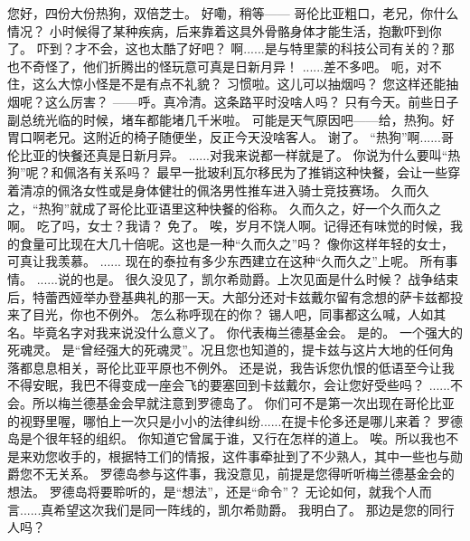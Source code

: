 \documentclass[openany]{book}
\begin{document}
\begin{dialogue}
     您好，四份大份热狗，双倍芝士。
     好嘞，稍等——
     \*哥伦比亚粗口\*，老兄，你什么情况？
     小时候得了某种疾病，后来靠着这具外骨骼身体才能生活，抱歉吓到你了。
     吓到？才不会，这也太酷了好吧？
     啊......是与特里蒙的科技公司有关的？那也不奇怪了，他们折腾出的怪玩意可真是日新月异！
     ......差不多吧。
     呃，对不住，这么大惊小怪是不是有点不礼貌？
     习惯啦。这儿可以抽烟吗？
     您这样还能抽烟呢？这么厉害？
     ——呼。真冷清。这条路平时没啥人吗？
     只有今天。前些日子副总统光临的时候，堵车都能堵几千米啦。
     可能是天气原因吧——给，热狗。好胃口啊老兄。这附近的椅子随便坐，反正今天没啥客人。
     谢了。
     “热狗”啊......哥伦比亚的快餐还真是日新月异。
     ......对我来说都一样就是了。
     你说为什么要叫“热狗”呢？和佩洛有关系吗？
     最早一批玻利瓦尔移民为了推销这种快餐，会让一些穿着清凉的佩洛女性或是身体健壮的佩洛男性推车进入骑士竞技赛场。
     久而久之，“热狗”就成了哥伦比亚语里这种快餐的俗称。
     久而久之，好一个久而久之啊。
     吃了吗，女士？我请？
     免了。
     唉，岁月不饶人啊。记得还有味觉的时候，我的食量可比现在大几十倍呢。这也是一种“久而久之”吗？
     像你这样年轻的女士，可真让我羡慕。
     ......
     现在的泰拉有多少东西建立在这种“久而久之”上呢。
     所有事情。
     ......说的也是。
     很久没见了，凯尔希勋爵。上次见面是什么时候？
     战争结束后，特蕾西娅举办登基典礼的那一天。大部分还对卡兹戴尔留有念想的萨卡兹都投来了目光，你也不例外。
     怎么称呼现在的你？
     锡人吧，同事都这么喊，人如其名。毕竟名字对我来说没什么意义了。
     你代表梅兰德基金会。
     是的。
     一个强大的死魂灵。
     是“曾经强大的死魂灵”。况且您也知道的，提卡兹与这片大地的任何角落都息息相关，哥伦比亚平原也不例外。
     还是说，我告诉您仇恨的低语至今让我不得安眠，我巴不得变成一座会飞的要塞回到卡兹戴尔，会让您好受些吗？
     ......不会。所以梅兰德基金会早就注意到罗德岛了。
     你们可不是第一次出现在哥伦比亚的视野里喔，哪怕上一次只是小小的法律纠纷......在提卡伦多还是哪儿来着？
     罗德岛是个很年轻的组织。
     你知道它曾属于谁，又行在怎样的道上。
     唉。所以我也不是来劝您收手的，根据特工们的情报，这件事牵扯到了不少熟人，其中一些也与勋爵您不无关系。
     罗德岛参与这件事，我没意见，前提是您得听听梅兰德基金会的想法。
     罗德岛将要聆听的，是“想法”，还是“命令”？
     无论如何，就我个人而言......真希望这次我们是同一阵线的，凯尔希勋爵。
     我明白了。
     那边是您的同行人吗？
\end{dialogue}
\end{document}

